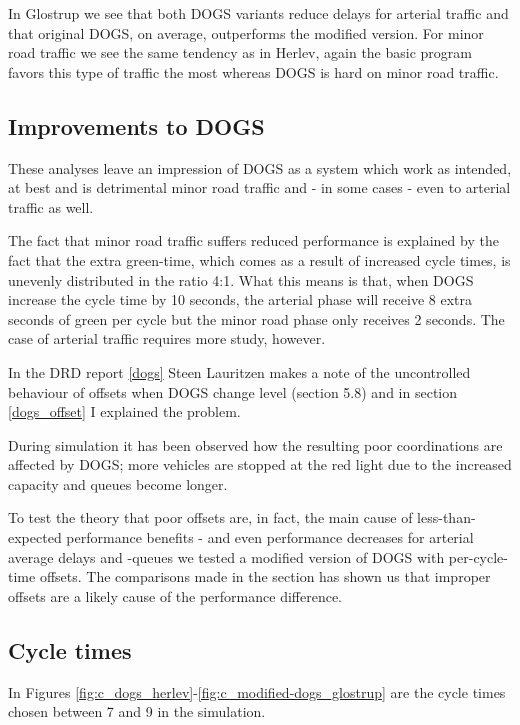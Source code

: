 In Glostrup we see that both DOGS variants reduce delays for arterial traffic and that original DOGS, on average, outperforms the modified version. For minor road traffic we see the same tendency as in Herlev, again the basic program favors this type of traffic the most whereas DOGS is hard on minor road traffic.

\subsection*{Improvements to DOGS}
These analyses leave an impression of DOGS as a system which work as intended, at best and is detrimental minor road traffic and - in some cases - even to arterial traffic as well.

The fact that minor road traffic suffers reduced performance is explained by the fact that the extra green-time, which comes as a result of increased cycle times, is unevenly distributed in the ratio 4:1. What this means is that, when DOGS increase the cycle time by 10 seconds, the arterial phase will receive 8 extra seconds of green per cycle but the minor road phase only receives 2 seconds. 
The case of arterial traffic requires more study, however.

In the DRD report \ref{dogs} Steen Lauritzen makes a note of the uncontrolled behaviour of offsets when DOGS change level (section 5.8) and in section \ref{dogs_offset} I explained the problem.

During simulation it has been observed how the resulting poor coordinations are affected by DOGS; more vehicles are stopped at the red light due to the increased capacity and queues become longer. 

To test the theory that poor offsets are, in fact, the main cause of less-than-expected performance benefits - and even performance decreases for arterial average delays and -queues we tested a modified version of DOGS with per-cycle-time offsets. The comparisons made in the section has shown us that improper offsets are a likely cause of the performance difference.

\subsection*{Cycle times}
In Figures \ref{fig:c_dogs_herlev}-\ref{fig:c_modified-dogs_glostrup} are the cycle times chosen between 7 and 9 in the simulation.

